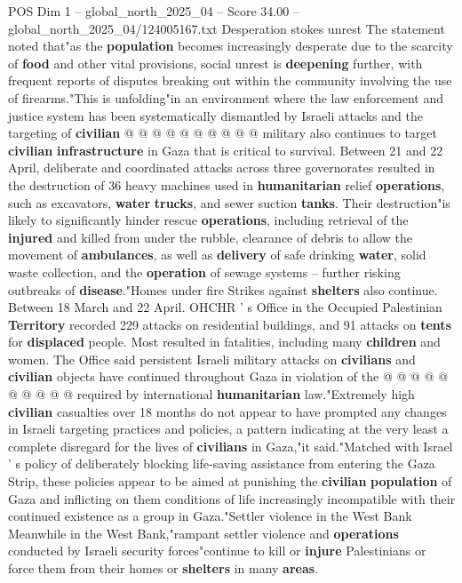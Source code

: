 \begin{textsample}{POS Dim 1 – global\_north\_2025\_04 – Score 34.00 – global\_north\_2025\_04/124005167.txt}
Desperation stokes unrest The statement noted that"as the \textbf{population} becomes increasingly desperate due to the scarcity of \textbf{food} and other vital provisions, social unrest is \textbf{deepening} further, with frequent reports of disputes breaking out within the community involving the use of firearms."This is unfolding"in an environment where the law enforcement and justice system has been systematically dismantled by Israeli attacks and the targeting of \textbf{civilian} @ @ @ @ @ @ @ @ @ @ military also continues to target \textbf{civilian} \textbf{infrastructure} in Gaza that is critical to survival.
Between 21 and 22 April, deliberate and coordinated attacks across three governorates resulted in the destruction of 36 heavy machines used in \textbf{humanitarian} relief \textbf{operations}, such as excavators, \textbf{water} \textbf{trucks}, and sewer suction \textbf{tanks}.
Their destruction"is likely to significantly hinder rescue \textbf{operations}, including retrieval of the \textbf{injured} and killed from under the rubble, clearance of debris to allow the movement of \textbf{ambulances}, as well as \textbf{delivery} of safe drinking \textbf{water}, solid waste collection, and the \textbf{operation} of sewage systems -- further risking outbreaks of \textbf{disease}."Homes under fire Strikes against \textbf{shelters} also continue.
Between 18 March and 22 April.
OHCHR ' s Office in the Occupied Palestinian \textbf{Territory} recorded 229 attacks on residential buildings, and 91 attacks on \textbf{tents} for \textbf{displaced} people.
Most resulted in fatalities, including many \textbf{children} and women.
The Office said persistent Israeli military attacks on \textbf{civilians} and \textbf{civilian} objects have continued throughout Gaza in violation of the @ @ @ @ @ @ @ @ @ @ required by international \textbf{humanitarian} law."Extremely high \textbf{civilian} casualties over 18 months do not appear to have prompted any changes in Israeli targeting practices and policies, a pattern indicating at the very least a complete disregard for the lives of \textbf{civilians} in Gaza,"it said."Matched with Israel ' s policy of deliberately blocking life-saving assistance from entering the Gaza Strip, these policies appear to be aimed at punishing the \textbf{civilian} \textbf{population} of Gaza and inflicting on them conditions of life increasingly incompatible with their continued existence as a group in Gaza."Settler violence in the West Bank Meanwhile in the West Bank,"rampant settler violence and \textbf{operations} conducted by Israeli security forces"continue to kill or \textbf{injure} Palestinians or force them from their homes or \textbf{shelters} in many \textbf{areas}.

\end{textsample}

